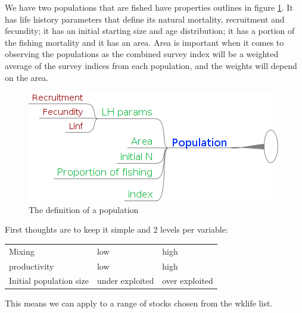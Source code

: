 \documentclass[a4paper,english]{article}
\begin{document}
We have two populations that are fished have properties outlines in figure \ref{fig:brainstorm}.  It has life history parameters that define its natural mortality, recruitment and fecundity; it has an initial starting size and age distribution; it has a portion of the fishing mortality and it has an area.  Area is important when it comes to observing the populations as the combined survey index will be a weighted average of the survey indices from each population, and the weights will depend on the area.  

\begin{figure}[htb]
\centering
\includegraphics[scale=.5]{BrainStorm}
\caption{The definition of a population}
\label{fig:brainstorm}
\end{figure}

First thoughts are to keep it simple and 2 levels per variable:

\begin{table}[H]
    \begin{tabular}{l|ll}
        \hline
        Mixing                  & low             & high           \\
        productivity            & low             & high           \\ 
        Initial population size & under exploited & over exploited \\
        \hline
    \end{tabular}
\end{table}

This means we can apply to a range of stocks chosen from the wklife list.  



\end{document}
